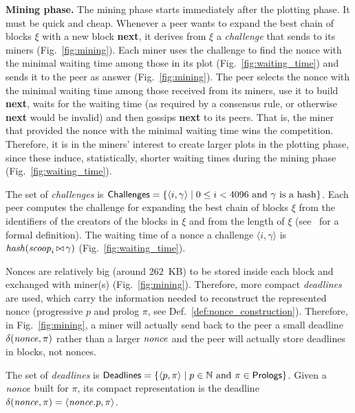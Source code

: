\vspace{0.5ex}\noindent\textbf{Mining phase.}
%
The mining phase starts immediately after the plotting phase. It must be quick and cheap.
Whenever a peer wants to expand the best chain of blocks $\xi$ with
a new block \textbf{next},
it derives from $\xi$ a \emph{challenge} that sends to its miners
(Fig.~\ref{fig:mining}). Each miner uses
the challenge to find the nonce with the minimal waiting time among those
in its plot (Fig.~\ref{fig:waiting_time}) and sends it to the peer as answer
(Fig.~\ref{fig:mining}).
The peer selects the nonce with the minimal waiting time
among those received from its miners, use it to build \textbf{next}, waits for the
waiting time (as required by a consensus rule, or otherwise \textbf{next} would be invalid)
and then gossips \textbf{next} to its peers.
That is, the miner that provided the nonce with the minimal waiting time wins the
competition.
Therefore, it is in the miners' interest to create larger plots in the
plotting phase, since these induce, statistically, shorter waiting times
during the mining phase (Fig.~\ref{fig:waiting_time}).
%
\begin{definition}[Challenge]\label{def:challenge}
  The set of \emph{challenges} is ${\mathsf{Challenges}}=\{\langle i,\gamma\rangle\mid 0\le i<4096\text{ and $\gamma$ is a hash}\}$.
  Each peer computes the challenge
  for expanding the best chain of blocks $\xi$ from the identifiers of the creators of the blocks in $\xi$
  and from the length of $\xi$ (see~\cite{Spoto25} for a formal definition).
  The waiting time of a nonce \wrt{} a challenge $\langle i,\gamma\rangle$
  is ${\mathit{hash}}({\mathit{scoop}}_i\operatorname*{\bowtie}\gamma)$ (Fig.~\ref{fig:waiting_time}).
\end{definition}
%
Nonces are relatively big (around $262$~KB) to be stored inside each block and exchanged with miner(s)
(Fig.~\ref{fig:mining}). Therefore, more compact \emph{deadlines} are used, which
carry the information needed
to reconstruct the represented nonce (progressive $p$ and prolog $\pi$, see Def.~\ref{def:nonce_construction}).
Therefore, in Fig.~\ref{fig:mining}, a miner
will actually send back to the peer a small deadline $\delta({\mathit{nonce}},\pi)$ rather than a larger ${\mathit{nonce}}$
and the peer will actually store deadlines in blocks, not nonces.
%
\begin{definition}[Deadline]\label{def:deadline}
  The set of \emph{deadlines} is ${\mathsf{Deadlines}}=\{\langle p,\pi\rangle\mid p\in\mathbb{N}\text{ and }\pi\in{\mathsf{Prologs}}\}$.
  Given a ${\mathit{nonce}}$ built for $\pi$, its compact representation is
  the deadline $\delta({\mathit{nonce}},\pi)=\langle{\mathit{nonce}}.p,\pi\rangle$.
\end{definition}

